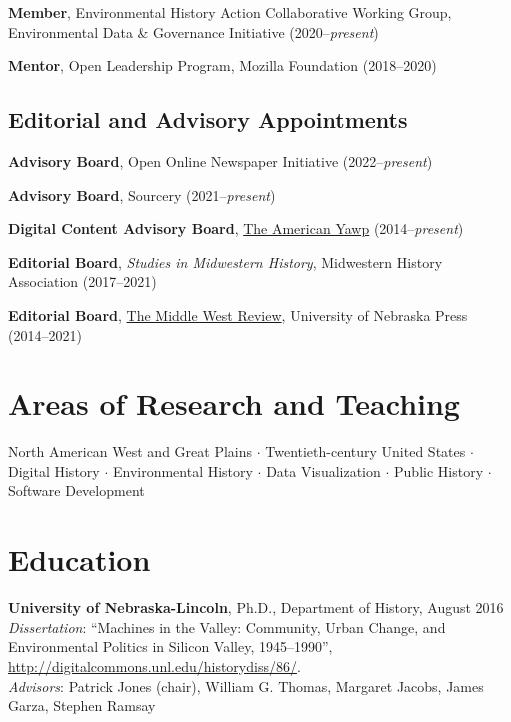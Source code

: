 \documentclass[10pt]{article}
\begin{document}
\textbf{Member}, Environmental History Action Collaborative Working Group, Environmental Data \& Governance Initiative (2020--\textit{present})

\textbf{Mentor}, Open Leadership Program, Mozilla Foundation (2018--2020)

\subsection*{Editorial and Advisory Appointments}

\textbf{Advisory Board}, Open Online Newspaper Initiative (2022--\textit{present})

\textbf{Advisory Board}, Sourcery (2021--\textit{present})

\textbf{Digital Content Advisory Board}, \href{http://www.americanyawp.com/}{The American Yawp} (2014--\textit{present})

\textbf{Editorial Board}, \textit{Studies in Midwestern History}, Midwestern History Association (2017--2021)

\textbf{Editorial Board}, \href{https://uimiddle.wordpress.com/}{The Middle West Review}, University of Nebraska Press (2014--2021)


\section*{Areas of Research and Teaching}

North American West and Great Plains $\cdot$ Twentieth-century United States $\cdot$ Digital History $\cdot$ Environmental History $\cdot$ Data Visualization $\cdot$ Public History $\cdot$ Software Development


\section*{Education}

\textbf{University of Nebraska-Lincoln}, Ph.D., Department of History, August 2016 \\
\textit{Dissertation}: ``Machines in the Valley: Community, Urban Change, and Environmental Politics in Silicon Valley, 1945--1990'', \url{http://digitalcommons.unl.edu/historydiss/86/}. \\
\textit{Advisors}: Patrick Jones (chair), William G. Thomas, Margaret Jacobs, James Garza, Stephen Ramsay
\end{document}

